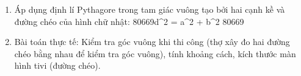 \begin{enumerate}
\item Áp dụng định lí Pythagore trong tam giác vuông tạo bởi hai cạnh kề và đường chéo của hình chữ nhật:
80669d^2 = a^2 + b^2 \implies {}80669
\item Bài toán thực tế: Kiểm tra góc vuông khi thi công (thợ xây đo hai đường chéo bằng nhau để kiểm tra góc vuông), tính khoảng cách, kích thước màn hình tivi (đường chéo).
\end{enumerate}
